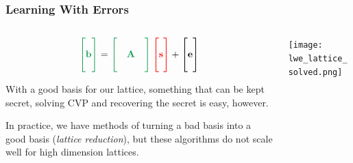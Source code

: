 \documentclass[
aspectratio=169, %
t, %
onlytextwidth, %
10pt, %
]{beamer}
\begin{document}

\begin{frame}
    \frametitle{Learning With Errors}
    \begin{columns}[T] %
        \begin{column}{0.48\linewidth} %
            \begin{tcolorbox}[colback=ICLBlue!5!white,colframe=ICLBlue,title=Learning With Errors Problem (LWE)]
                \[
                    \color{ForestGreen} \begin{bmatrix} \\ \mathbf{b} \\ \\ \end{bmatrix} \color{black} = \color{ForestGreen} \begin{bmatrix} & & \\ & \mathbf{A} & \\ & & \end{bmatrix} \color{red} \begin{bmatrix} \\  \mathbf{s} \\ \\ \end{bmatrix} \color{black} + \begin{bmatrix} \\ \mathbf{e} \\ \\ \end{bmatrix}
                \]
            \end{tcolorbox}

            With a good basis for our lattice, something that can be kept secret, solving CVP and recovering the secret is easy, however.

            In practice, we have methods of turning a bad basis into a good basis (\textit{lattice reduction}), but these algorithms do not scale well for high dimension lattices.
        \end{column}
        \begin{column}{0.48\linewidth} %
            \texttt{[image: lwe\_lattice\_solved.png]} %
        \end{column}
    \end{columns}
\end{frame}
\end{document}
